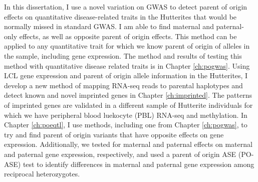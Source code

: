 In this dissertation, I use a novel variation on GWAS to detect parent of origin effects on quantitative disease-related traits in the Hutterites that would be normally missed in standard GWAS. I am able to find maternal and paternal-only effects, as well as opposite parent of origin effects. This method can be applied to any quantitative trait for which we know parent of origin of alleles in the sample, including gene expression. The method and results of testing this method with quantitative disease related traits is in Chapter \ref{ch:pogwas}. Using LCL gene expression and parent of origin allele information in the Hutterites, I develop a new method of mapping RNA-seq reads to parental haplotypes and detect known and novel imprinted genes in Chapter \ref{ch:imprinted}. The patterns of imprinted genes are validated in a different sample of Hutterite individuals for which we have peripheral blood luekocyte (PBL) RNA-seq and methylation. In Chapter \ref{ch:poeqtl}, I use methods, including one from Chapter \ref{ch:pogwas}, to try and find parent of origin variants that have opposite effects on gene expression. Additionally, we tested for maternal and paternal effects on maternal and paternal gene expression, respectively, and used a parent of origin ASE (PO-ASE) test to identify differences in maternal and paternal gene expression among reciprocal heterozygotes. 

